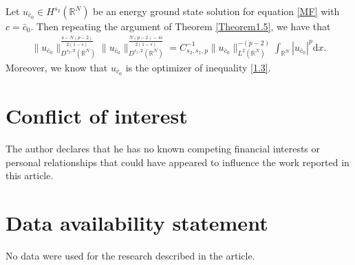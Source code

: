 \documentclass[12pt,a4paper,reqno]{amsart}
\numberwithin{equation}{section}
\begin{document}
Let $u_{\bar{c}_{0}}\in H^{s_{2}}(\mathbb{R}^{N})$ be an energy ground state solution for equation \eqref{MF} with $c=\bar{c}_{0}$.
Then repeating the argument of Theorem \ref{Theorem1.5},
we have that
\begin{equation*}
\begin{aligned}
\|u_{\bar{c}_{0}}\|_{D^{s_{2},2}(\mathbb{R}^{N})}^{\frac{4-N(p-2)}{2(1-s)}}
\|u_{\bar{c}_{0}}\|_{D^{s_{1},2}(\mathbb{R}^{N})}^{\frac{N(p-2)-4s}{2(1-s)}}
=C_{s_{2},s_{1},p}^{-1}\|u_{\bar{c}_{0}}\|_{L^{2}(\mathbb{R}^{N})}^{-(p-2)}
\int_{\mathbb{R}^{N}}
|u_{\bar{c}_{0}}|^{p}
\mathrm{d}x.
\end{aligned}
\end{equation*}
Moreover, we know that $u_{\bar{c}_{0}}$ is the optimizer of inequality \eqref{1.3}.


\section*{Conflict of interest}
The author declares that he has no known competing financial interests or personal relationships that could have appeared to influence the work reported in
this article.

\section*{Data availability statement}
No data were used for the research described in the article.
\end{document}
